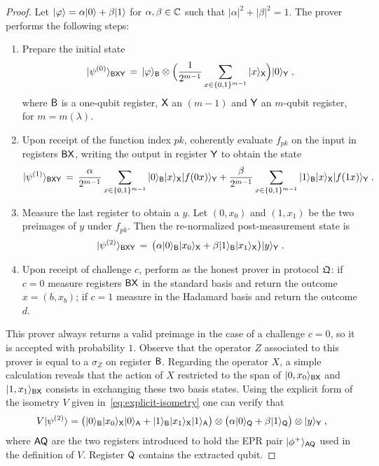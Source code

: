 \begin{proof}
Let $|\varphi\rangle = \alpha|0\rangle + \beta |1\rangle$ for $\alpha,\beta\in\mathbb{C}$ such that $|\alpha|^2 + |\beta|^2 =1$. The prover performs the following steps:
\begin{enumerate}
\item Prepare the initial state 
\[ |\psi^{(0)}\rangle_{{\textsf{BXY}}} \,=\, |\varphi\rangle_{\textsf{B}}\otimes \Big(\frac{1}{2^{m-1}} \sum_{x\in\{0,1\}^{m-1}} |x\rangle_{{\textsf{X}}}\Big) |0\rangle_{{\textsf{Y}}}\;,\]
where ${\textsf{B}}$ is a one-qubit register, ${\textsf{X}}$ an $(m-1)$ and ${\textsf{Y}}$ an $m$-qubit register, for $m=m(\lambda)$. 
\item Upon receipt of the function index $pk$, coherently evaluate $f_{pk}$ on the input in registers ${\textsf{BX}}$, writing the output in register ${\textsf{Y}}$ to obtain the state
\[ |\psi^{(1)}\rangle_{{\textsf{BXY}}} \,=\,  \frac{\alpha}{2^{m-1}}\sum_{x\in\{0,1\}^{m-1}} |0\rangle_{\textsf{B}}|x\rangle_{\textsf{X}}|f(0x)\rangle_{\textsf{Y}} +  \frac{\beta }{2^{m-1}}\sum_{x\in\{0,1\}^{m-1}} |1\rangle_{\textsf{B}}|x\rangle_{\textsf{X}}|f(1x)\rangle_{\textsf{Y}} \;.\]
\item Measure the last register to obtain a $y$. Let $(0,x_0)$ and $(1,x_1)$ be the two preimages of $y$ under $f_{pk}$. Then the re-normalized post-measurement state is
\[ |\psi^{(2)}\rangle_{{\textsf{BXY}}} \,=\, \big(\alpha |0\rangle_{\textsf{B}}|x_0\rangle_{\textsf{X}} + \beta |1\rangle_{\textsf{B}}|x_1\rangle_{\textsf{X}}\big)|y\rangle_{\textsf{Y}} \;.\]
\item Upon receipt of challenge $c$, perform as the honest prover in protocol $\mathfrak{Q}$: if $c=0$ measure registers ${\textsf{BX}}$ in the standard basis and return the outcome $x=(b,x_b)$; if $c=1$ measure in the Hadamard basis and return the outcome $d$.
\end{enumerate}
This prover always returns a valid preimage in the case of a challenge $c=0$, so it is accepted with probability $1$. Observe that the operator $Z$ associated to this prover is equal to a $\sigma_Z$ on register ${\textsf{B}}$. Regarding the operator $X$, a simple calculation reveals that the action of $X$ restricted to the span of $|0,x_0\rangle_{{\textsf{BX}}}$ and $|1,x_1\rangle_{{\textsf{BX}}}$ consists in exchanging these two basis states. Using the explicit form of the isometry $V$ given in~\eqref{eq:explicit-isometry} one can verify that 
\[ V |\psi^{(2)}\rangle = \big(|0\rangle_{\textsf{B}} |x_0\rangle_{\textsf{X}} |0\rangle_{\textsf{A}} + |1\rangle_{\textsf{B}} |x_1\rangle_{\textsf{X}} |1\rangle_{\textsf{A}}\big) \otimes \big(\alpha|0\rangle_{\textsf{Q}} + \beta|1\rangle_{{\textsf{Q}}} \big)\otimes |y\rangle_{\textsf{Y}}\;,\]
where ${\textsf{AQ}}$ are the two registers introduced to hold the EPR pair $|\phi^+\rangle_{{\textsf{AQ}}}$ used in the definition of $V$. Register ${\textsf{Q}}$ contains the extracted qubit. 
\end{proof}


